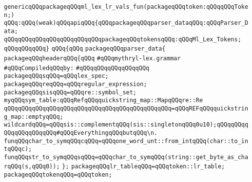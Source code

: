 \label{src/app/future-lex/src/frontends/lex/mythryl-lex.grammar.pkg}
\verb|genericqQQqpackageqQQqml_lex_lr_vals_fun(packageqQQqtoken:qQQqqQQqToken;)|\newline
\verb|qQQq:qQQq(weak)qQQqapiqQQq{qQQqpackageqQQqparser_dataqQQq:qQQqParser_Data;|\newline
\verb|qQQqqQQqqQQqqQQqqQQqqQQqqQQqpackageqQQqtokensqQQq:qQQqMl_Lex_Tokens;|\newline
\verb|qQQqqQQqqQQq}|\newline
\verb|qQQq{qQQq|\newline
\verb|packageqQQqparser_data{|\newline
\verb|packageqQQqheaderqQQq{qQQq|\newline
\verb|#qQQqmythryl-lex.grammar|\newline
\newline
\verb|#qQQqCompiledqQQqby:|\newline
\verb|#qQQqqQQqqQQqqQQqqQQq|\newline
\newline
\verb|packageqQQqsqQQq=qQQqlex_spec;|\newline
\newline
\verb|packageqQQqreqQQq=qQQqregular_expression;|\newline
\verb|packageqQQqsisqQQq=qQQqre::symbol_set;|\newline
\newline
\verb|myqQQqsym_table:qQQqRefqQQqquickstring_map::MapqQQqre::Re|\newline
\verb|qQQqqQQqqQQqqQQqqQQqqQQqqQQqqQQqqQQqqQQqqQQqqQQq=qQQqREFqQQqquickstring_map::emptyqQQq;|\newline
\newline
\verb|wildcardqQQq=qQQqsis::complementqQQq(sis::singletonqQQq0u10);qQQqqQQqqQQqqQQqqQQqqQQq#qQQqEverythingqQQqbutqQQq\n.|\newline
\newline
\verb|funqQQqchar_to_symqQQqcqQQq=qQQqone_word_unt::from_intqQQq(char::to_intqQQqc);|\newline
\verb|funqQQqstr_to_symqQQqsqQQq=qQQqchar_to_symqQQq(string::get_byte_as_charqQQq(s,qQQq0));|\newline
\newline
\newline
\verb|};|\newline
\verb|packageqQQqlr_tableqQQq=qQQqtoken::lr_table;|\newline
\verb|packageqQQqtokenqQQq=qQQqtoken;|\newline

